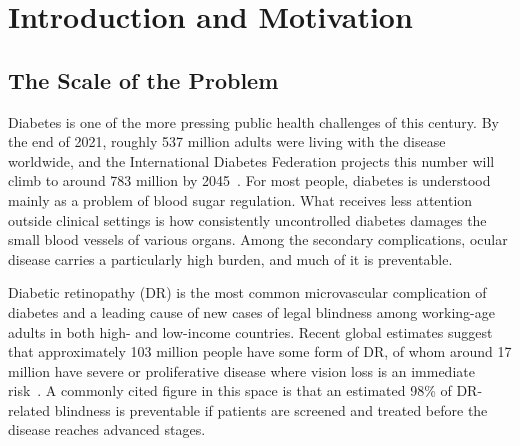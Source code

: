 \documentclass[12pt,a4paper]{article}
\begin{document}
\begin{abstract}
Beyond the reported results, the paper documents the training challenges that arise when working with a dataset of around 330 images, including the majority-class collapse behaviour observed in ten standard-configuration ablation variants, and the specific design choices required to overcome it. We hope both the architecture and the training methodology are useful reference points for similar small-dataset medical imaging problems.

\vspace{0.5em}
\noindent \textbf{Keywords:} Diabetic Retinopathy, Diabetic Macular Edema, Multi-Task Learning, Atrous Spatial Pyramid Pooling, Dilated ResNet, Quadratic Weighted Kappa

\end{abstract}

\newpage
\tableofcontents
\newpage

\section{Introduction and Motivation}

\subsection{The Scale of the Problem}

Diabetes is one of the more pressing public health challenges of this century. By the end of 2021, roughly 537 million adults were living with the disease worldwide, and the International Diabetes Federation projects this number will climb to around 783 million by 2045~\cite{IDF2021}. For most people, diabetes is understood mainly as a problem of blood sugar regulation. What receives less attention outside clinical settings is how consistently uncontrolled diabetes damages the small blood vessels of various organs. Among the secondary complications, ocular disease carries a particularly high burden, and much of it is preventable.

Diabetic retinopathy (DR) is the most common microvascular complication of diabetes and a leading cause of new cases of legal blindness among working-age adults in both high- and low-income countries. Recent global estimates suggest that approximately 103 million people have some form of DR, of whom around 17 million have severe or proliferative disease where vision loss is an immediate risk~\cite{IDF2021}. A commonly cited figure in this space is that an estimated 98\% of DR-related blindness is preventable if patients are screened and treated before the disease reaches advanced stages.
\end{document}

